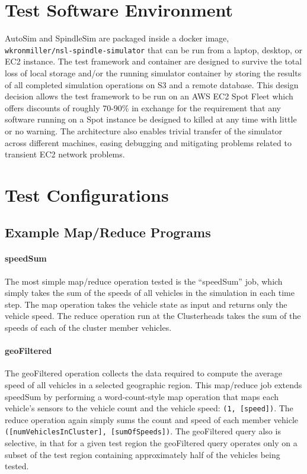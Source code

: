 \documentclass{thesis}
\begin{document}
\section{Test Software Environment}
    AutoSim and SpindleSim are packaged inside a docker image, \\\verb|wkronmiller/nsl-spindle-simulator| that can be run from
    a laptop, desktop, or EC2 instance. The test framework and container are designed to survive the total loss of local
    storage and/or the running simulator container by storing the results of all completed simulation operations on
    S3 and a remote database. This design decision allows the test framework to be run on an AWS EC2 Spot Fleet %
    which offers discounts of roughly 70-90\% in exchange for the requirement that any software running on a Spot instance
    be designed to killed at any time with little or no warning. %
    The architecture also enables trivial transfer of the simulator across different machines, easing debugging and mitigating
    problems related to transient EC2 network problems. 

\section{Test Configurations}
\subsection{Example Map/Reduce Programs}
    \paragraph{speedSum}
        The most simple map/reduce operation tested is the ``speedSum'' job, which simply takes the sum of the speeds of all
        vehicles in the simulation in each time step. The map operation takes the vehicle state as input and returns only
        the vehicle speed. The reduce operation run at the Clusterheads takes the sum of the speeds
        of each of the cluster member vehicles.
    \paragraph{geoFiltered}
        The geoFiltered operation collects the data required to compute the average speed of all vehicles in a selected
        geographic region. This map/reduce job extends speedSum by performing a word-count-style map operation that maps each vehicle's sensors
        to the vehicle count and the vehicle speed: \verb|(1, [speed])|. The reduce operation again simply sums the count
        and speed of each member vehicle \verb|([numVehiclesInCluster], [sumOfSpeeds])|. The geoFiltered query also is selective,
        in that for a given test region the geoFiltered query operates only on a subset of the test region containing approximately
        half of the vehicles being tested.
\end{document}
